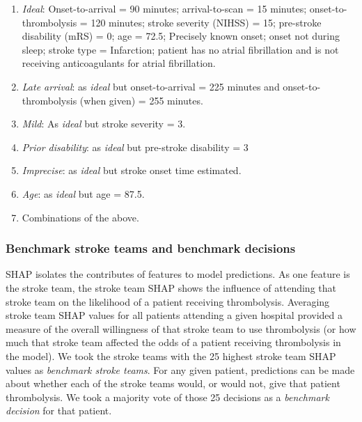 \begin{enumerate}
    \item \textit{Ideal}: Onset-to-arrival = 90 minutes; arrival-to-scan = 15 minutes; onset-to-thrombolysis = 120 minutes; stroke severity (NIHSS) = 15; pre-stroke disability (mRS) = 0; age = 72.5; Precisely known onset; onset not during sleep; stroke type = Infarction; patient has no atrial fibrillation and is not receiving anticoagulants for atrial fibrillation.

    \item \textit{Late arrival}: as \textit{ideal} but onset-to-arrival = 225 minutes and onset-to-thrombolysis (when given) = 255 minutes.

    \item \textit{Mild}: As \textit{ideal} but stroke severity = 3.

    \item \textit{Prior disability}: as \textit{ideal} but pre-stroke disability = 3

    \item \textit{Imprecise}: as \textit{ideal} but stroke onset time estimated.

    \item \textit{Age}: as \textit{ideal} but age = 87.5.

    \item Combinations of the above.
\end{enumerate}

\subsubsection{Benchmark stroke teams and benchmark decisions}

SHAP isolates the contributes of features to model predictions. As one feature is the stroke team, the stroke team SHAP shows the influence of attending that stroke team on the likelihood of a patient receiving thrombolysis. Averaging stroke team SHAP values for all patients attending a given hospital provided a measure of the overall willingness of that stroke team to use thrombolysis (or how much that stroke team affected the odds of a patient receiving thrombolysis in the model). We took the stroke teams with the 25 highest stroke team SHAP values as \textit{benchmark stroke teams}. For any given patient, predictions can be made about whether each of the stroke teams would, or would not, give that patient thrombolysis. We took a majority vote of those 25 decisions as a \textit{benchmark decision} for that patient.

